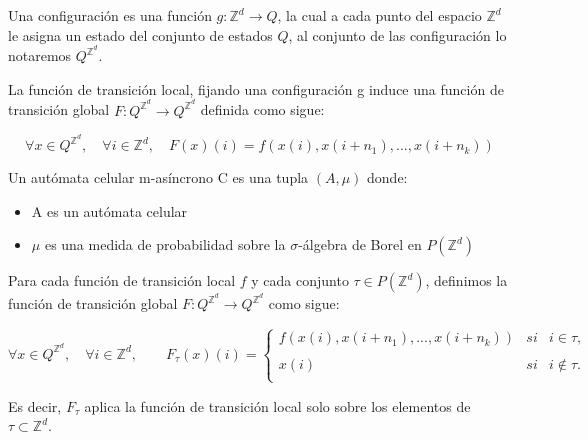 \documentclass[../proyecto.tex]{memoir}
\begin{document}
\begin{defi}
Una configuración es una función $g: \mathds{Z}^{d} \rightarrow Q$, la cual a cada punto del espacio $\mathds{Z}^{d}$ le asigna un estado del conjunto de estados $Q$, al conjunto de las configuración lo notaremos $Q^{\mathds{Z}^{d}}$. 
\end{defi}

\begin{defi}
La función de transición local, fijando una configuración g induce una función de transición global $F:Q^{\mathds{Z}^{d}} \rightarrow Q^{\mathds{Z}^{d}}$ definida como sigue:

\begin{equation*}
\forall x \in Q^{\mathds{Z}^{d}}, \quad \forall i \in \mathds{Z}^{d}, \quad F(x)(i) = f(x(i),x(i+n_{1}),...,x(i+n_{k}))
\end{equation*}

\end{defi}

\begin{defi}
Un autómata celular m-asíncrono C es una tupla $(A, \mu)$ donde: 
\begin{itemize}
\item A es un autómata celular 
\item $\mu$ es una medida de probabilidad sobre la $\sigma$-álgebra de Borel en $P(\mathds{Z}^{d})$
\end{itemize} 
\end{defi}

\begin{defi}
Para cada función de transición local $f$ y cada conjunto $\tau \in P(\mathds{Z}^{d})$, definimos la función de transición global $F:Q^{\mathds{Z}^{d}} \rightarrow Q^{\mathds{Z}^{d}}$ como sigue:

\begin{equation*}
	\forall x \in Q^{\mathds{Z}^{d}}, \quad \forall i \in \mathds{Z}^{d}, \qquad
	F_{\tau}(x)(i) = \left\{ \begin{array}{lcc}
             f(x(i),x(i+n_{1}),...,x(i+n_{k})) &   si  & i \in \tau ,\\
             \\ x(i) & si  & i \notin \tau .\\
             \end{array}
             \right.
\end{equation*}

Es decir, $F_{\tau}$ aplica la función de transición local solo sobre los elementos de $\tau \subset \mathds{Z}^{d}$. 
\end{defi}
\end{document}
